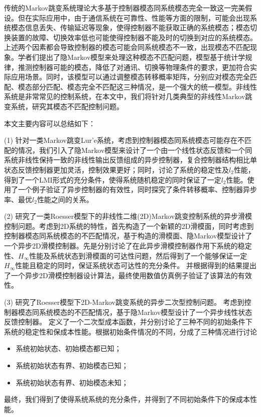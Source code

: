 
\begin{cabstract}
	传统的Markov跳变系统理论大多基于控制器模态同系统模态完全一致这一完美假设。但在实际应用中，由于通信系统在可靠性、性能等方面的限制，可能会出现系统模态信息丢失、传输延迟等现象，使得控制器不能获取正确的系统模态；模态切换装置的故障、切换效率低也可能使得控制器不能及时的切换到对应的系统模态。上述两个因素都会导致控制器的模态可能会同系统模态不一致，出现模态不匹配现象。学者们提出了隐Markov模型来处理这种模态不匹配问题，模型基于统计学规律，推测控制器可能的模态，降低了对通讯、切换等物理条件的要求，更加符合实际应用场景。同时，该模型可以通过调整模态转移概率矩阵，分别应对模态完全匹配、模态部分匹配、模态完全不匹配这三种情况，是一个强大的统一模型。非线性系统是非常常见的控制系统，在本文中，我们将针对几类典型的非线性Markov跳变系统，研究其模态不匹配控制问题。
	
	本文主要内容可以总结如下：
	
	(1) 针对一类Markov跳变Lur'e系统，考虑到控制器模态同系统模态可能存在不匹配的情况，我们引入了隐Markov模型来设计了一个由一个线性状态反馈和一个同系统非线性保持一致的非线性输出反馈组成的异步控制器，复合控制器结构相比单状态反馈控制器更加灵活，控制效果更好；同时，讨论了系统的稳定性及$l_2$性能，得到了一个LMI形式的充分条件，使得系统随机稳定的同时保证了一定$l_2$性能。使用了一个例子验证了异步控制器的有效性，同时探究了条件转移概率、控制器异步率、最优$l_2$性能之间的关系。
	
	(2) 研究了一类Roesser模型下的非线性二维(2D)Markov跳变控制系统的异步滑模控制问题。考虑到2D系统的特性，首先构造了一个新颖的2D滑模面，同时考虑到控制器模态同系统模态的不匹配情况，基于构造的滑模面、隐Markov模型设计了一个异步2D滑模控制器。先是分别讨论了在此异步滑模控制器作用下系统的稳定性、$H_\infty$性能及系统状态到滑模面的可达性问题，然后得到了一个能够保证一定$H_\infty$性能且稳定的同时，保证系统状态可达性的充分条件。 并根据得到的结果提出了一个异步2D滑模控制器设计算法，最终使用数值仿真例子验证了该算法的有效性。
	
	(3) 研究了Roesser模型下2D-Markov跳变系统的异步二次型控制问题。 考虑到控制器模态同系统模态的不匹配情况，基于隐Markov模型设计了一个异步线性状态反馈控制器。 定义了一个二次型成本函数，并分别讨论了三种不同的初始条件下系统的稳定性和保成本性能。根据初始条件情况的不同，分成了三种情况进行讨论
		\begin{itemize}
			\item 系统初始状态、初始模态都已知；
			\item 系统初始状态有界、初始模态已知；
			\item 系统初始状态有界、初始模态未知；
		\end{itemize}
	最终，我们得到了使得系统系统的充分条件，并得到了不同初始条件下的保成本性能。
	

  
\end{cabstract}


